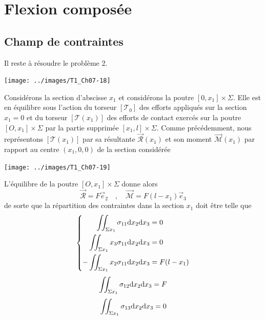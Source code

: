 \section{Flexion composée} \label{sec:Ch07-3}
\subsection{Champ de contraintes} \label{ssec:Ch07-3.1}
Il reste à résoudre le problème 2.
\begin{center}
    \texttt{[image: ../images/T1\_Ch07-18]}
\end{center}
Considérons la section d'abscisse $x_1$ et considérons la poutre $\left[ 0,x_1 \right] \times \Sigma$.
Elle est en équilibre sous l'action du torseur $[\mathcal{T}_0]$ des efforts appliqués sur la section $x_1 = 0$ et du torseur $[\mathcal{T}(x_1)]$ des efforts de contact exercés sur la poutre  $[O,x_1]\times \Sigma$ par la partie supprimée $[x_1,l]\times \Sigma$.
Comme précédemment, nous représentons $[\mathcal{T}(x_1)]$ par sa  résultante $\vec{\mathcal{R}} (x_1)$ et son moment $\vec{\mathcal{M}} (x_1)$ par rapport au centre $(x_1,0,0)$ de la section considérée
\begin{center}
    \texttt{[image: ../images/T1\_Ch07-19]}
\end{center}
L'équilibre de la poutre $[O,x_1]\times \Sigma$ donne alors
\begin{displaymath}
    \vec{\mathcal{R}} = F \vec{e}_2 \quad,\quad \vec{\mathcal{M}} = F (l -x_1) \vec{e}_3
\end{displaymath}
de sorte que la répartition des contraintes dans la section $x_1$ doit être telle que
\begin{equation}
    \left\{
    \begin{aligned}
        \iint_{\Sigma x_1} \sigma_{11} \mathrm{d} x_2 \mathrm{d} x_3 &= 0 \\
        \iint_{\Sigma x_1} x_3\sigma_{11} \mathrm{d} x_2 \mathrm{d} x_3 &= 0 \\
        -\iint_{\Sigma x_1} x_2\sigma_{11} \mathrm{d} x_2 \mathrm{d} x_3 &= F (l-x_1)
    \end{aligned}
    \right.
    \label{eq:Ch07-092}
\end{equation}
\begin{equation}
    \iint_{\Sigma x_1} \sigma_{12} \mathrm{d} x_2 \mathrm{d} x_3 = F
    \label{eq:Ch07-093}
\end{equation}
\begin{equation}
    \iint_{\Sigma x_1} \sigma_{13} \mathrm{d} x_2 \mathrm{d} x_3 = 0
    \label{eq:Ch07-094}
\end{equation}
